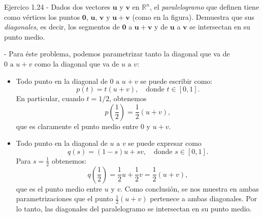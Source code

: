 \documentclass[11pt,letterpaper]{article}
\begin{document}
\begin{inciso}{Ejercico 1.24}
- Dados dos vectores \( \mathbf{u} \) y \( \mathbf{v} \) en \( \mathbb{R}^n \), el \textit{paralelogramo} que definen tiene como vértices los puntos \( \mathbf{0} \), \( \mathbf{u} \), \( \mathbf{v} \) y \( \mathbf{u} + \mathbf{v} \) (como en la figura). Demuestra que sus \textit{diagonales}, es decir, los segmentos de \( \mathbf{0} \) a \( \mathbf{u} + \mathbf{v} \) y de \( \mathbf{u} \) a \( \mathbf{v} \) se intersectan en su punto medio.

\begin{demostracion}{}
- Para éste problema, podemos parametrizar tanto la diagonal que va de $0 \text{ a } u+v$ como la diagonal que va de $u \text{ a } v$:

\begin{itemize}
    \item Todo punto en la diagonal de $0 \text{ a } u+v$ se puede escribir como: 
    \begin{equation*}
        p(t)= t(u+v), \quad \text{donde } t\in [0,1].
    \end{equation*}
    En particular, cuando $t=1/2$, obtenemos
    \begin{equation*}
        p \left(\frac{1}{2}\right) = \frac{1}{2}(u+v),
    \end{equation*}
    que es claramente el punto medio entre $0 \text{ y } u+v$.
    \item Todo punto en la diagonal de $u \text{ a } v$ se puede expresar como 
    \begin{equation*}
        q(s)=(1-s)u + sv, \quad \text{donde } s \in [0,1].
    \end{equation*}
    Para $s=\frac{1}{2}$ obtenemos: 
    \begin{equation*}
        q\left(\frac{1}{2}\right)= \frac{1}{2}u + \frac{1}{2} v = \frac{1}{2}(u+v),
    \end{equation*}
    que es el punto medio entre $u \text{ y } v$. 
    Como conclusión, se nos muestra en ambas parametrizaciones que el punto $\frac{1}{2} (u + v)$ pertenece a ambas diagonales. Por lo tanto, las diagonales del paralelogramo se intersectan en su punto medio. 
\end{itemize}
\end{demostracion}
\end{inciso}
\end{document}
